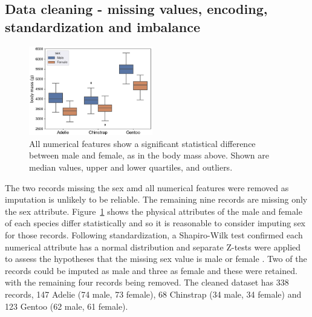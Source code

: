 \documentclass[12pt]{article}
\begin{document}
\vspace{\baselineskip}
\subsection*{Data cleaning - missing values, encoding, standardization and imbalance}

\begin{figure} %
  \centering
  \vspace{-1.5\baselineskip} %
  \includegraphics[width=0.48\textwidth]{sex.png} %
  \vspace{-0.5\baselineskip} %
  \caption{All numerical features show a significant statistical difference between male and female, 
  as in the body mass above. Shown are median values, upper and lower quartiles, 
  and outliers.}
  \vspace{-0.5\baselineskip} %
  \label{fig:sex}
\end{figure}   

The two records missing the sex amd all numerical features were removed as imputation is unlikely to be reliable. 
The remaining nine records are missing only the sex attribute. Figure~\ref{fig:sex} shows the physical 
attributes of the male and female of each species differ statistically and so it is reasonable to 
consider imputing sex for those records. Following standardization, 
a Shapiro-Wilk test confirmed each numerical attribute has a normal distribution \cite{shapiro1965analysis} 
and separate Z-tests were applied to assess the 
hypotheses that the missing sex value is male or female \cite{freedman2007statistics}. 
Two of the records could be imputed as male and three as female 
and these were retained. with the remaining four records being removed. 
The cleaned dataset has 338 records, 147 Adelie  
(74 male, 73 female), 68 Chinstrap (34 male, 34 female) and 123 Gentoo (62 male, 61 female).
\end{document}
